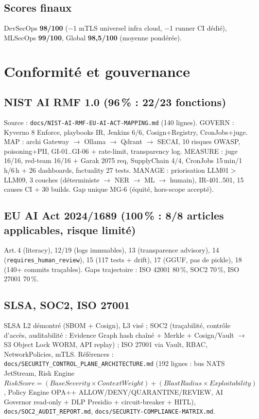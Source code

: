 \documentclass[12pt,a4paper,openany]{report}
\begin{document}
\section{Scores finaux}

DevSecOps \textbf{98/100} ($-$1 mTLS universel infra cloud, $-$1 runner CI dédié),
MLSecOps \textbf{99/100}, Global \textbf{98,5/100} (moyenne pondérée).

\chapter{Conformité et gouvernance}
\label{ch:conformite}

\section{NIST AI RMF 1.0 (96\,\% : 22/23 fonctions)}

Source : \texttt{docs/NIST-AI-RMF-EU-AI-ACT-MAPPING.md} (140 lignes).
GOVERN : Kyverno 8 Enforce, playbooks IR, Jenkins 6/6, Cosign+Registry, CronJobs+juge.
MAP : archi Gateway $\rightarrow$ Ollama $\rightarrow$ Qdrant $\rightarrow$ SECAI,
10 risques OWASP, poisoning+PII, GI-01..GI-06 + rate-limit, transparency log.
MEASURE : juge 16/16, red-team 16/16 + Garak 2075 req, SupplyChain 4/4,
CronJobs 15\,min/1\,h/6\,h + 26 dashboards, factuality 27 tests.
MANAGE : priorisation LLM01$>$LLM09, 3 couches (déterministe $\rightarrow$ NER $\rightarrow$ ML $\rightarrow$ humain),
IR-401..501, 15 causes CI + 30 builds.
Gap unique MG-6 (équité, hors-scope accepté).

\section{EU AI Act 2024/1689 (100\,\% : 8/8 articles applicables, risque limité)}

Art.\,4 (literacy), 12/19 (logs immuables), 13 (transparence advisory),
14 (\texttt{requires\_human\_review}), 15 (117 tests + drift),
17 (GGUF, pas de pickle), 18 (140+ commits traçables).
Gaps trajectoire : ISO 42001 80\,\%, SOC2 70\,\%, ISO 27001 70\,\%.

\section{SLSA, SOC2, ISO 27001}

SLSA L2 démontré (SBOM + Cosign), L3 visé ; SOC2 (traçabilité, contrôle d'accès,
auditabilité : Evidence Graph hash chaîné + Merkle + Cosign/Vault $\rightarrow$ S3 Object Lock WORM,
API replay) ; ISO 27001 via Vault, RBAC, NetworkPolicies, mTLS.
Références : \texttt{docs/SECURITY\_CONTROL\_PLANE\_ARCHITECTURE.md} (192 lignes :
bus NATS JetStream, Risk Engine $RiskScore=(BaseSeverity \times ContextWeight)+(BlastRadius \times Exploitability)$,
Policy Engine OPA++ ALLOW/DENY/QUARANTINE/REVIEW, AI Governor read-only + DLP Presidio + circuit-breaker + HITL),
\texttt{docs/SOC2\_AUDIT\_REPORT.md}, \texttt{docs/SECURITY-COMPLIANCE-MATRIX.md}.
\end{document}
